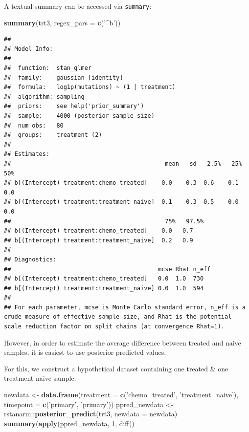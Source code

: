 \documentclass[]{article}
\newenvironment{Shaded}{\begin{snugshade}}{\end{snugshade}}
\newcommand{\KeywordTok}[1]{\textcolor[rgb]{0.13,0.29,0.53}{\textbf{{#1}}}}
\newcommand{\DataTypeTok}[1]{\textcolor[rgb]{0.13,0.29,0.53}{{#1}}}
\newcommand{\DecValTok}[1]{\textcolor[rgb]{0.00,0.00,0.81}{{#1}}}
\newcommand{\StringTok}[1]{\textcolor[rgb]{0.31,0.60,0.02}{{#1}}}
\newcommand{\NormalTok}[1]{{#1}}
\begin{document}
A textual summary can be accessed via \texttt{summary}:

\begin{Shaded}
\begin{Highlighting}[]
\KeywordTok{summary}\NormalTok{(trt3, }\DataTypeTok{regex_pars =} \KeywordTok{c}\NormalTok{(}\StringTok{'^b'}\NormalTok{))}
\end{Highlighting}
\end{Shaded}

\begin{verbatim}
## 
## Model Info:
## 
##  function:  stan_glmer
##  family:    gaussian [identity]
##  formula:   log1p(mutations) ~ (1 | treatment)
##  algorithm: sampling
##  priors:    see help('prior_summary')
##  sample:    4000 (posterior sample size)
##  num obs:   80
##  groups:    treatment (2)
## 
## Estimates:
##                                            mean   sd   2.5%   25%   50%
## b[(Intercept) treatment:chemo_treated]    0.0    0.3 -0.6   -0.1   0.0 
## b[(Intercept) treatment:treatment_naive]  0.1    0.3 -0.5    0.0   0.0 
##                                            75%   97.5%
## b[(Intercept) treatment:chemo_treated]    0.0   0.7   
## b[(Intercept) treatment:treatment_naive]  0.2   0.9   
## 
## Diagnostics:
##                                          mcse Rhat n_eff
## b[(Intercept) treatment:chemo_treated]   0.0  1.0  730  
## b[(Intercept) treatment:treatment_naive] 0.0  1.0  594  
## 
## For each parameter, mcse is Monte Carlo standard error, n_eff is a crude measure of effective sample size, and Rhat is the potential scale reduction factor on split chains (at convergence Rhat=1).
\end{verbatim}

However, in order to estimate the average difference between treated and
naive samples, it is easiest to use posterior-predicted values.

For this, we construct a hypothetical dataset containing one treated \&
one treatment-naive sample.

\begin{Shaded}
\begin{Highlighting}[]
\NormalTok{newdata <-}\StringTok{ }\KeywordTok{data.frame}\NormalTok{(}\DataTypeTok{treatment =} \KeywordTok{c}\NormalTok{(}\StringTok{'chemo_treated'}\NormalTok{, }\StringTok{'treatment_naive'}\NormalTok{),}
                      \DataTypeTok{timepoint =} \KeywordTok{c}\NormalTok{(}\StringTok{'primary'}\NormalTok{, }\StringTok{'primary'}\NormalTok{))}
\NormalTok{ppred_newdata <-}\StringTok{ }\NormalTok{rstanarm::}\KeywordTok{posterior_predict}\NormalTok{(trt3, }\DataTypeTok{newdata =} \NormalTok{newdata)}
\KeywordTok{summary}\NormalTok{(}\KeywordTok{apply}\NormalTok{(ppred_newdata, }\DecValTok{1}\NormalTok{, diff))}
\end{Highlighting}
\end{Shaded}
\end{document}
